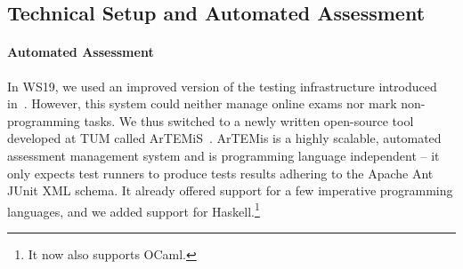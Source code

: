 \subsection{Technical Setup and Automated Assessment}\label{sec:tech_setup_test}

\paragraph{Automated Assessment}
In WS19, we used an improved version of
the testing infrastructure introduced in~\cite{next_1100}.
However, this system could neither manage online exams nor mark non-programming tasks.
We thus switched to a newly written open-source
tool developed at TUM called ArTEMiS~\cite{artemis}.
ArTEMis is a highly scalable, automated assessment management system and is programming language independent --
it only expects test runners to produce tests results
adhering to the Apache Ant JUnit XML schema.
It already offered support for a few imperative programming languages,
and we added support for Haskell.\footnote{It now also supports OCaml.}

